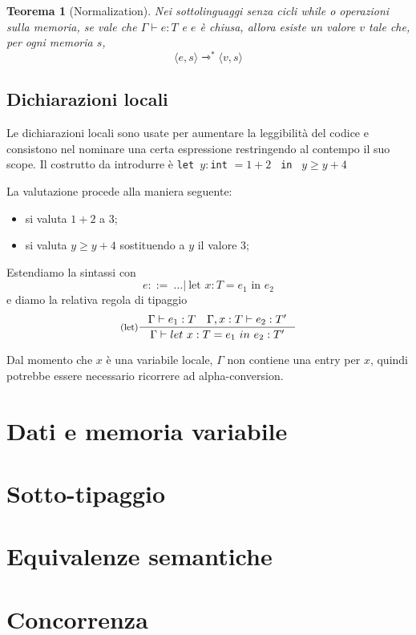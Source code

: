 \documentclass[a4paper, 11pt]{article}
\newtheorem{thm}{Teorema}[section]
\newcommand{\type}{\Gamma \vdash}
\begin{document}
\begin{thm}[Normalization]
	Nei sottolinguaggi senza cicli while o operazioni sulla memoria, se vale che $\type e:T$ e $e$ è chiusa, allora esiste un valore $v$ tale che, per ogni memoria $s$, \[ \langle e,s \rangle \rightarrowtriangle^\ast \langle v,s \rangle \]
\end{thm}

\subsection{Dichiarazioni locali}
Le dichiarazioni locali sono usate per aumentare la leggibilità del codice e consistono nel nominare una certa espressione restringendo al contempo il suo scope. Il costrutto da introdurre è \lstinline|let |$y:$\lstinline|int| $=1+2$ \lstinline| in |  $y \geq y+4$

La valutazione procede alla maniera seguente:\begin{itemize}
	\item si valuta $1+2$ a $3$;
	\item si valuta $y \geq y+4$ sostituendo a $y$ il valore $3$;
\end{itemize}

Estendiamo la sintassi con \[ e::=\ \dots |\ \text{let } x:T = e_1\text{ in } e_2  \] e diamo la relativa regola di tipaggio \[ \inference[(let)]{\type e_1:T \quad \Gamma,x:T \vdash e_2:T'}{\type let\ x:T = e_1\ in\ e_2:T'} \]

Dal momento che $x$ è una variabile locale, $\Gamma$ non contiene una entry per $x$, quindi potrebbe essere necessario ricorrere ad alpha-conversion.










\section{Dati e memoria variabile}

\section{Sotto-tipaggio}

\section{Equivalenze semantiche}

\section{Concorrenza}
\end{document}
